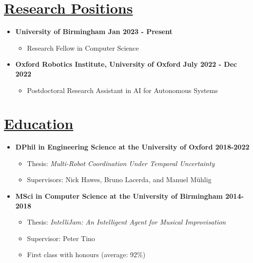 \documentclass[11pt]{article}
\begin{document}
\section*{\uline{Research Positions}}
\begin{itemize}
\item \textbf{University of Birmingham \hfill Jan 2023 - Present} 
\begin{itemize}
    \item Research Fellow in Computer Science
\end{itemize}
\item \textbf{Oxford Robotics Institute, University of Oxford \hfill July 2022 - Dec 2022} 
\begin{itemize}
    \item Postdoctoral Research Assistant in AI for Autonomous Systems
\end{itemize}
\end{itemize}
	
\section*{\uline{Education}}
\begin {itemize}
\item \textbf{DPhil in Engineering Science at the University of Oxford \hfill 2018-2022} 
\begin{itemize}
    \item Thesis: \emph{Multi-Robot Coordination Under Temporal Uncertainty}
    \item Supervisors: Nick Hawes, Bruno Lacerda, and Manuel M{\"u}hlig
\end{itemize}
			
\item \textbf{MSci in Computer Science at the University of Birmingham \hfill 2014-2018}
\begin{itemize}
\item Thesis: \emph{IntelliJam: An Intelligent Agent for Musical Improvisation}
\item Supervisor: Peter Tino
\item First class with honours (average: 92\%)
\end{itemize}
\end{itemize}
\end{document}
